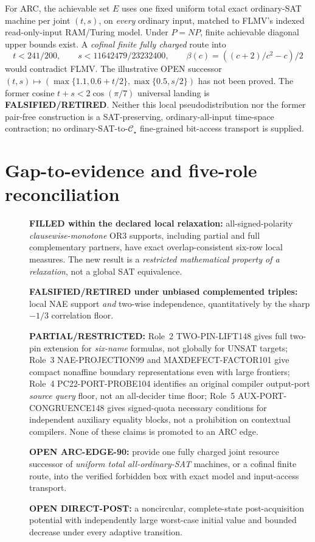 \documentclass[11pt]{article}
\newcommand{\CS}{\mathcal C_\star}
\begin{document}
For ARC, the achievable set $E$ uses one fixed uniform total exact ordinary-SAT machine per joint $(t,s)$, on \emph{every} ordinary input, matched to FLMV's indexed read-only-input RAM/Turing model. Under $P=NP$, finite achievable diagonal upper bounds exist. A \emph{cofinal finite fully charged} route into
\[
  t<241/200,\qquad s<11642479/23232400,\qquad
  \beta(c)=((c+2)/c^2-c)/2
\]
would contradict FLMV. The illustrative OPEN successor $(t,s)\mapsto(\max\{1.1,0.6+t/2\},\max\{0.5,s/2\})$ has not been proved. The former cosine $t+s<2\cos(\pi/7)$ universal landing is \textbf{FALSIFIED/RETIRED}. Neither this local pseudodistribution nor the former pair-free construction is a SAT-preserving, ordinary-all-input time-space contraction; no ordinary-SAT-to-$\CS$ fine-grained bit-access transport is supplied.

\section{Gap-to-evidence and five-role reconciliation}
\begin{description}
\item[] \textbf{FILLED within the declared local relaxation:} all-signed-polarity \emph{clausewise-monotone} OR3 supports, including partial and full complementary partners, have exact overlap-consistent six-row local measures. The new result is a \emph{restricted mathematical property of a relaxation}, not a global SAT equivalence.
\item[] \textbf{FALSIFIED/RETIRED under unbiased complemented triples:} local NAE support \emph{and} two-wise independence, quantitatively by the sharp $-1/3$ correlation floor.
\item[] \textbf{PARTIAL/RESTRICTED:} Role~2 TWO-PIN-LIFT148 gives full two-pin extension for \emph{six-name} formulas, not globally for UNSAT targets; Role~3 NAE-PROJECTION99 and MAXDEFECT-FACTOR101 give compact nonaffine boundary representations even with large frontiers; Role~4 PC22-PORT-PROBE104 identifies an original compiler output-port \emph{source query} floor, not an all-decider time floor; Role~5 AUX-PORT-CONGRUENCE148 gives signed-quota necessary conditions for independent auxiliary equality blocks, not a prohibition on contextual compilers. None of these claims is promoted to an ARC edge.
\item[] \textbf{OPEN ARC-EDGE-90:} provide one fully charged joint resource successor of \emph{uniform total all-ordinary-SAT} machines, or a cofinal finite route, into the verified forbidden box with exact model and input-access transport.
\item[] \textbf{OPEN DIRECT-POST:} a noncircular, complete-state post-acquisition potential with independently large worst-case initial value and bounded decrease under every adaptive transition.
\end{description}
\end{document}
